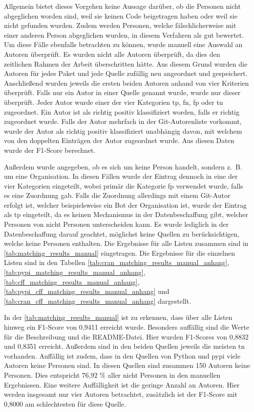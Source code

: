 Allgemein bietet dieses Vorgehen keine Aussage darüber, ob die Personen nicht abgeglichen worden sind, weil sie keinen Code beigetragen haben oder weil sie nicht gefunden wurden.
Zudem werden Personen, welche fälschlicherweise mit einer anderen Person abgeglichen wurden, in diesem Verfahren als gut bewertet.
Um diese Fälle ebenfalls betrachten zu können, wurde manuell eine Auswahl an Autoren überprüft.
Es wurden nicht alle Autoren überprüft, da dies den zeitlichen Rahmen der Arbeit überschritten hätte.
Aus diesem Grund wurden die Autoren für jedes Paket und jede Quelle zufällig neu angeordnet und gespeichert.
Anschließend wurden jeweils die ersten beiden Autoren anhand von vier Kriterien überprüft.
Falls nur ein Autor in einer Quelle genannt wurde, wurde nur dieser überprüft.
Jeder Autor wurde einer der vier Kategorien \gls{tp}, \gls{fn}, \gls{fp} oder \gls{tn} zugeordnet.
Ein Autor ist als richtig positiv klassifiziert worden, falls er richtig zugeordnet wurde.
Falls der Autor mehrfach in der Git-Autorenliste vorkommt, wurde der Autor als richtig positiv klassifiziert unabhängig davon, mit welchem von den doppelten Einträgen der Autor zugeordnet wurde.
Aus diesen Daten wurde der F1-Score berechnet.

Außerdem wurde angegeben, ob es sich um keine Person handelt, sondern z. B. um eine Organisation.
In diesen Fällen wurde der Eintrag dennoch in eine der vier Kategorien eingeteilt, wobei primär die Kategorie \gls{fp} verwendet wurde, falls es eine Zuordnung gab.
Falls die Zuordnung allerdings mit einem Git-Autor erfolgt ist, welcher beispielsweise ein Bot der Organisation ist, wurde der Eintrag als \gls{tp} eingeteilt, da es keinen Mechanismus in der Datenbeschaffung gibt, welcher Personen von nicht Personen unterscheiden kann.
Es wurde lediglich in der Datenbeschaffung darauf geachtet, möglichst keine Quellen zu berücksichtigen, welche keine Personen enthalten.
Die Ergebnisse für alle Listen zusammen sind in \autoref{tab:matching_results_manual} eingetragen.
Die Ergebnisse für die einzelnen Listen sind in den Tabellen \ref{tab:cran_matching_results_manual_anhang}, \ref{tab:pypi_matching_results_manual_anhang}, \ref{tab:cff_matching_results_manual_anhang}, \ref{tab:pypi_cff_matching_results_manual_anhang} und \ref{tab:cran_cff_matching_results_manual_anhang} dargestellt.

In der \autoref{tab:matching_results_manual} ist zu erkennen, dass über alle Listen hinweg ein F1-Score von 0,9411 erreicht wurde.
Besonders auffällig sind die Werte für die Beschreibung und die README-Datei.
Hier wurden F1-Scores von 0,8832 und 0,8351 erreicht.
Außerdem sind in den beiden Quellen jeweils die meisten \gls{tn} vorhanden.
Auffällig ist zudem, dass in den Quellen von Python und \gls{pypi} viele Autoren keine Personen sind.
In diesen Quellen sind zusammen 150 Autoren keine Personen.
Dies entspricht 76,92 \% aller nicht Personen in den manuellen Ergebnissen.
Eine weitere Auffälligkeit ist die geringe Anzahl an  Autoren.
Hier werden insgesamt nur vier Autoren betrachtet, zusätzlich ist der F1-Score mit 0,8000 am schlechtesten für diese Quelle.

